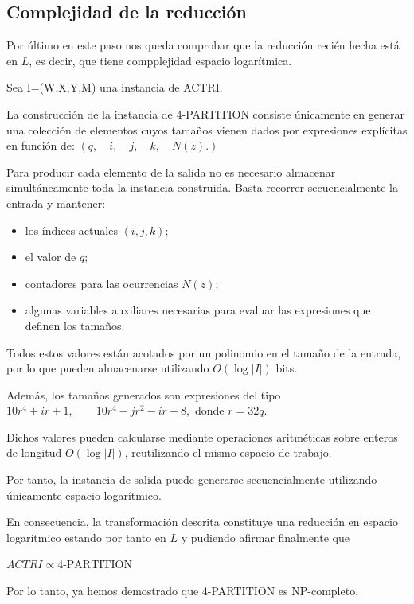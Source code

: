 \documentclass{article}
\begin{document}
\subsection*{Complejidad de la reducción}
Por último en este paso nos queda comprobar que la reducción recién hecha está en $L$, es decir, que tiene compplejidad espacio logarítmica.

Sea I=(W,X,Y,M) una instancia de ACTRI.

La construcción de la instancia de 4-PARTITION consiste únicamente en generar una colección de elementos cuyos tamaños vienen dados por expresiones explícitas en función de:
$(
q,\quad i,\quad j,\quad k,\quad N(z).
)$

Para producir cada elemento de la salida no es necesario almacenar simultáneamente toda la instancia construida. Basta recorrer secuencialmente la entrada y mantener:

\begin{itemize}
\item los índices actuales $(i,j,k)$;
\item el valor de $q$;
\item contadores para las ocurrencias $N(z)$;
\item algunas variables auxiliares necesarias para evaluar las expresiones que definen los tamaños.
\end{itemize}

Todos estos valores están acotados por un polinomio en el tamaño de la entrada, por lo que pueden almacenarse utilizando $O(\log |I|)$ bits.

Además, los tamaños generados son expresiones del tipo $10r^4+ir+1,
\qquad
10r^4-jr^2-ir+8,$ donde $r=32q$.

Dichos valores pueden calcularse mediante operaciones aritméticas sobre enteros de longitud $O(\log |I|)$, reutilizando el mismo espacio de trabajo.

Por tanto, la instancia de salida puede generarse secuencialmente utilizando únicamente espacio logarítmico.

En consecuencia, la transformación descrita constituye una reducción en espacio logarítmico estando por tanto en $L$ y pudiendo afirmar finalmente que 

\vspace{1\baselineskip}
$ACTRI \propto 4\text{-PARTITION}$

\vspace{1\baselineskip}
Por lo tanto, ya hemos demostrado que 4-PARTITION es NP-completo.
\end{document}

